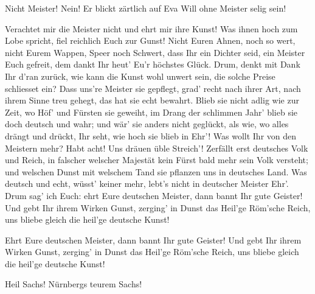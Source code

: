 \begin{drama}
\Waltherspeaks
{}

Nicht Meister! Nein!
Er blickt zärtlich auf Eva
Will ohne Meister selig sein!


\Sachsspeaks
{}

Verachtet mir die Meister nicht
und ehrt mir ihre Kunst!
Was ihnen hoch zum Lobe spricht,
fiel reichlich Euch zur Gunst!
Nicht Euren Ahnen, noch so wert,
nicht Eurem Wappen, Speer noch Schwert,
dass Ihr ein Dichter seid,
ein Meister Euch gefreit,
dem dankt Ihr heut' Eu'r höchstes Glück.
Drum, denkt mit Dank Ihr d'ran zurück,
wie kann die Kunst wohl unwert sein,
die solche Preise schliesset ein?
Dass uns're Meister sie gepflegt,
grad' recht nach ihrer Art,
nach ihrem Sinne treu gehegt,
das hat sie echt bewahrt.
Blieb sie nicht adlig wie zur Zeit,
wo Höf' und Fürsten sie geweiht,
im Drang der schlimmen Jahr'
blieb sie doch deutsch und wahr;
und wär' sie anders nicht geglückt,
als wie, wo alles drängt und drückt,
Ihr seht, wie hoch sie blieb in Ehr'!
Was wollt Ihr von den Meistern mehr?
Habt acht! Uns dräuen üble Streich'!
Zerfällt erst deutsches Volk und Reich,
in falscher welscher Majestät
kein Fürst bald mehr sein Volk versteht;
und welschen Dunst mit welschem Tand
sie pflanzen uns in deutsches Land.
Was deutsch und echt, wüsst' keiner mehr,
lebt's nicht in deutscher Meister Ehr'.
Drum sag' ich Euch:
ehrt Eure deutschen Meister,
dann bannt Ihr gute Geister!
Und gebt Ihr ihrem Wirken Gunst,
zerging' in Dunst
das Heil'ge Röm'sche Reich,
uns bliebe gleich
die heil'ge deutsche Kunst!




Ehrt Eure deutschen Meister,
dann bannt Ihr gute Geister!
Und gebt Ihr ihrem Wirken Gunst,
zerging' in Dunst
das Heil'ge Röm'sche Reich,
uns bliebe gleich
die heil'ge deutsche Kunst!




Heil Sachs! Nürnbergs teurem Sachs!

\end{drama}

